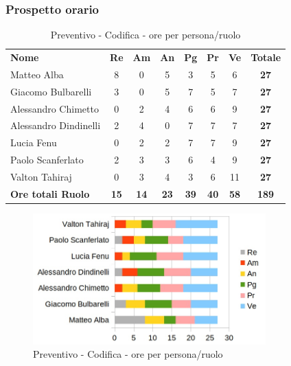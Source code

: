 	\subsubsection{Prospetto orario}

		\begin{table} [h!]
			\begin{center}
				\begin{tabular} { m{3.5cm} c c c c c c c }
					\rowcolor{lightgray}
					\textbf{Nome} & \textbf{Re} & \textbf{Am} & \textbf{An} & \textbf{Pg} & \textbf{Pr} & \textbf{Ve} & \textbf{Totale} \\
					Matteo Alba & 8 &0 & 5 & 3 & 5 & 6 & \textbf{27} \\
					Giacomo Bulbarelli & 3 & 0& 5 & 7 & 5 & 7 & \textbf{27} \\
					Alessandro Chimetto & 0& 2 & 4 & 6 & 6 & 9 & \textbf{27} \\
					Alessandro Dindinelli & 2 & 4 & 0& 7 & 7 & 7 & \textbf{27} \\
					Lucia Fenu &0 & 2 & 2 & 7 & 7 & 9 & \textbf{27} \\
					Paolo Scanferlato & 2 & 3 & 3 & 6 & 4 & 9 & \textbf{27} \\
					Valton Tahiraj &0 & 3 & 4 & 3 & 6 & 11 & \textbf{27} \\
					\textbf{Ore totali Ruolo} & \textbf{15} & \textbf{14} & \textbf{23} & \textbf{39} & \textbf{40}& \textbf{58} & \textbf{189}
				\end{tabular}
				\caption{Preventivo - Codifica  - ore per persona/ruolo}
			\end{center}
		\end{table}
		
		\begin{figure} [h!]
			\centering
			\includegraphics[width=0.8\textwidth]{res/img/grafici/progettazione_architetturale_ore_ruolo.jpg}
			\caption{Preventivo - Codifica  - ore per persona/ruolo} 
		\end{figure}
		

